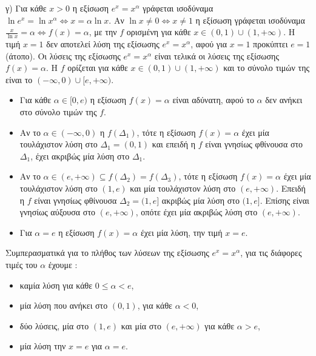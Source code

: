 \begin{alist}
\item \label{item:gamma} γ) Για κάθε $x > 0$ η εξίσωση $e^x = x^\alpha$ γράφεται ισοδύναμα $\ln e^x = \ln x^\alpha \Leftrightarrow x = \alpha \ln x$.
Αν $\ln x \ne 0 \Leftrightarrow x \ne 1$ η εξίσωση γράφεται ισοδύναμα $\frac{x}{\ln x} = \alpha \Leftrightarrow f(x) = \alpha$, με την $f$ ορισμένη για κάθε $x \in (0,1) \cup (1, +\infty)$.
Η τιμή $x = 1$ δεν αποτελεί λύση της εξίσωσης $e^x = x^\alpha$, αφού για $x=1$ προκύπτει $e=1$ (άτοπο).
Οι λύσεις της εξίσωσης $e^x = x^\alpha$ είναι τελικά οι λύσεις της εξίσωσης $f(x) = \alpha$.
Η $f$ ορίζεται για κάθε $x \in (0,1) \cup (1, +\infty)$ και το σύνολο τιμών της είναι το $(-\infty, 0) \cup [e, +\infty)$.
\begin{itemize}
    \item Για κάθε $\alpha \in [0, e)$ η εξίσωση $f(x) = \alpha$ είναι αδύνατη, αφού το $\alpha$ δεν ανήκει στο σύνολο τιμών της $f$.
    \item Αν το $\alpha \in (-\infty, 0)$ η $f(\Delta_1)$, τότε η εξίσωση $f(x) = \alpha$ έχει μία τουλάχιστον λύση στο $\Delta_1 = (0,1)$ και επειδή η $f$ είναι γνησίως φθίνουσα στο $\Delta_1$, έχει ακριβώς μία λύση στο $\Delta_1$.
    \item Αν το $\alpha \in (e, +\infty) \subseteq f(\Delta_2) = f(\Delta_3)$, τότε η εξίσωση $f(x) = \alpha$ έχει μία τουλάχιστον λύση στο $(1, e)$ και μία τουλάχιστον λύση στο $(e, +\infty)$. Επειδή η $f$ είναι γνησίως φθίνουσα $\Delta_2 = (1, e]$ ακριβώς μία λύση στο $(1, e]$. Επίσης είναι γνησίως αύξουσα στο $(e, +\infty)$, οπότε έχει μία ακριβώς λύση στο $(e, +\infty)$.
    \item Για $\alpha = e$ η εξίσωση $f(x) = \alpha$ έχει μία λύση, την τιμή $x = e$.
\end{itemize}
Συμπερασματικά για το πλήθος των λύσεων της εξίσωσης $e^x = x^\alpha$, για τις διάφορες τιμές του $\alpha$ έχουμε :
\begin{itemize}
    \item καμία λύση για κάθε $0 \le \alpha < e$,
    \item μία λύση που ανήκει στο $(0,1)$, για κάθε $\alpha < 0$,
    \item δύο λύσεις, μία στο $(1, e)$ και μία στο $(e, +\infty)$ για κάθε $\alpha > e$,
    \item μία λύση την $x = e$ για $\alpha = e$.
\end{itemize}
\end{alist}